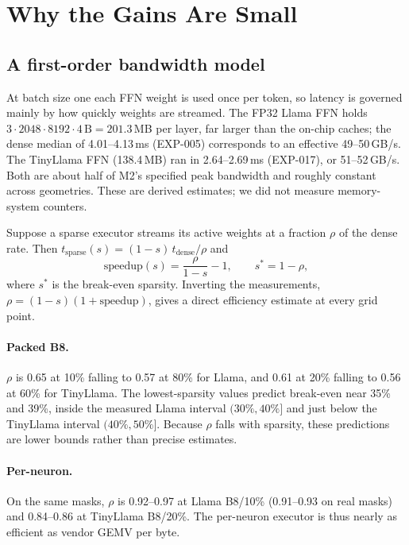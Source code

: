\section{Why the Gains Are Small}
\label{sec:analysis}

\subsection{A first-order bandwidth model}

At batch size one each FFN weight is used once per token, so latency is
governed mainly by how quickly weights are streamed. The FP32 Llama FFN holds
$3\cdot2048\cdot8192\cdot4\,\text{B}=201.3$\,MB per layer, far larger than the
on-chip caches; the dense median of 4.01--4.13\,ms (EXP-005) corresponds to an
effective 49--50\,GB/s. The TinyLlama FFN (138.4\,MB) ran in 2.64--2.69\,ms
(EXP-017), or 51--52\,GB/s. Both are about half of M2's specified peak
bandwidth and roughly constant across geometries. These are derived
estimates; we did not measure memory-system counters.

Suppose a sparse executor streams its active weights at a fraction $\rho$ of
the dense rate. Then $t_{\text{sparse}}(s)=(1-s)\,t_{\text{dense}}/\rho$ and
\begin{equation}
\text{speedup}(s)=\frac{\rho}{1-s}-1,\qquad s^{*}=1-\rho,
\label{eq:model}
\end{equation}
where $s^{*}$ is the break-even sparsity. Inverting the measurements,
$\rho=(1-s)(1+\text{speedup})$, gives a direct efficiency estimate at every
grid point.

\paragraph{Packed B8.} $\rho$ is 0.65 at 10\% falling to 0.57 at 80\% for
Llama, and 0.61 at 20\% falling to 0.56 at 60\% for TinyLlama. The
lowest-sparsity values predict break-even near 35\% and 39\%, inside the
measured Llama interval $(30\%,40\%]$ and just below the TinyLlama interval
$(40\%,50\%]$. Because $\rho$ falls with sparsity, these predictions are lower
bounds rather than precise estimates.

\paragraph{Per-neuron.} On the same masks, $\rho$ is 0.92--0.97 at Llama
B8/10\% (0.91--0.93 on real masks) and 0.84--0.86 at TinyLlama B8/20\%. The
per-neuron executor is thus nearly as efficient as vendor GEMV per byte.

